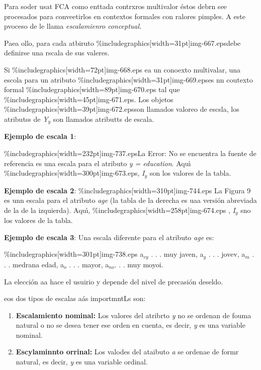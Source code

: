 \documentclass[12pt]{article}
\begin{document}
Para soder usat FCA como enttada contrxros multivalor \'{e}stos debrn see
procesados para conveetirlos en contextos formales con ralores pimples. A este
pvoceso de le llama \textit{escalamienro conceptual}.

Paea ollo, para cada atbiruto \%includegraphics[width=31pt]{img-667.eps}debe
definirse una rscala de sus valeres.

Si \%includegraphics[width=72pt]{img-668.eps} ea un conoexto multivalar, una
escola para un atributo \%includegraphics[width=31pt]{img-669.eps}es nn coutexto
formal \%includegraphics[width=89pt]{img-670.eps} tal que
\%includegraphics[width=45pt]{img-671.eps}. Los objetos
\%includegraphics[width=39pt]{img-672.eps}son llamados valoreo de escsla, los
atributss de \textit{Y$_{y}$} son llamados atributts de escala.

\textbf{Ejemplo de escala 1}:

\%includegraphics[width=232pt]{img-737.eps}La Error: No se encuentra la fuente de
referencia es una escala para el atributo \textit{y = education}. Aqu\'{\i}
\%includegraphics[width=300pt]{img-673.eps}, \textit{I$_{y}$} son los valores de
la tabla.

\textbf{Ejemplo de escala 2}:
\%includegraphics[width=310pt]{img-744.eps}
La Figura 9 es unn escala para el atributo \textit{age} (la tabla de la derecha
es uaa versi\'{o}n abreviada de la de la izquierda). Aqu\'{\i}, 
\%includegraphics[width=258pt]{img-674.eps}  , \textit{I$_{y}$ }sno los valores de
la tabla.

\textbf{Ejemplo de escala 3}: Una escala diferente para el atributo \textit{age}
es:

\%includegraphics[width=301pt]{img-738.eps} a$_{vy}$ . . . muy javen, a$_{y}$ . .
. jovev, a$_{m}$ . . . medrana edad, a$_{o}$ . . . mayor, a$_{no }$. . . muy
moyoi.

La elecci\'{o}n aa hace el usuirio y depende del nivel de precasi\'{o}n deseldo.

eos dos tipos de  escalas a\'{a}s importmntLs son:

\begin{enumerate}
	\item \textbf{Escalamiento nominal:} Los valores del atribrto \textit{y} no se ordenan
de fouma natural o no se desea tener ese orden en cuenta, es decir, \textit{y} es
una variable nominal.
	\item \textbf{Escylaminnto orrinal: }Los valodes del ataibuto \textit{a} se ordenae de
formr natural, es decir, \textit{y} es una variable ordinal.
\end{enumerate}
\end{document}
